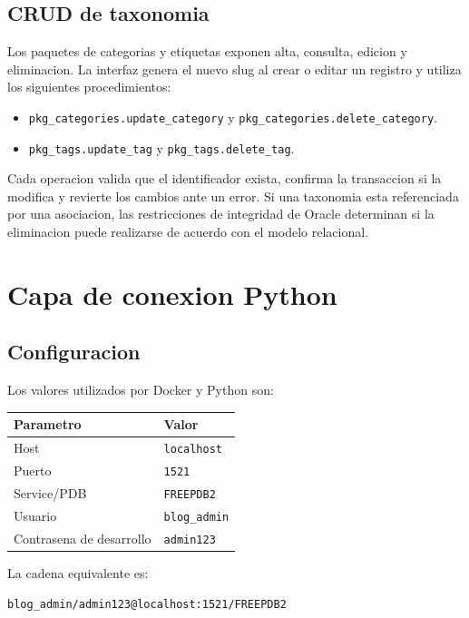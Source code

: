 \documentclass[12pt,a4paper]{article}
\begin{document}
\subsection{CRUD de taxonomia}

Los paquetes de categorias y etiquetas exponen alta, consulta, edicion y
eliminacion. La interfaz genera el nuevo slug al crear o editar un registro y
utiliza los siguientes procedimientos:

\begin{itemize}
    \item \texttt{pkg\_categories.update\_category} y
    \texttt{pkg\_categories.delete\_category}.
    \item \texttt{pkg\_tags.update\_tag} y
    \texttt{pkg\_tags.delete\_tag}.
\end{itemize}

Cada operacion valida que el identificador exista, confirma la transaccion si
la modifica y revierte los cambios ante un error. Si una taxonomia esta
referenciada por una asociacion, las restricciones de integridad de Oracle
determinan si la eliminacion puede realizarse de acuerdo con el modelo
relacional.

\section{Capa de conexion Python}

\subsection{Configuracion}

Los valores utilizados por Docker y Python son:

\begin{center}
\begin{tabular}{ll}
\toprule
\textbf{Parametro} & \textbf{Valor} \\
\midrule
Host & \texttt{localhost} \\
Puerto & \texttt{1521} \\
Service/PDB & \texttt{FREEPDB2} \\
Usuario & \texttt{blog\_admin} \\
Contrasena de desarrollo & \texttt{admin123} \\
\bottomrule
\end{tabular}
\end{center}

La cadena equivalente es:
\begin{lstlisting}
blog_admin/admin123@localhost:1521/FREEPDB2
\end{lstlisting}
\end{document}
